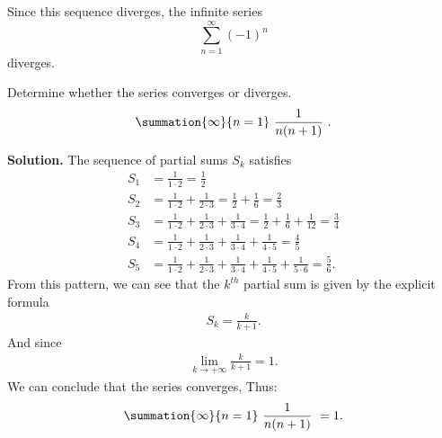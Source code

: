 \documentclass{report}
\begin{document}
    Since this sequence diverges, the infinite series 
    \[ \sum_{n=1}^{\infty} (-1)^n \]
    diverges.

    \bigbreak \noindent 
    \begin{eg}
     Determine whether the series converges or diverges. 
     \begin{align*}
         \summation{\infty}{n=1}\ \frac{1}{n(n+1)}\ 
     .\end{align*}

    \end{eg}
    \bigbreak \noindent 
    \textbf{Solution.}
    The sequence of partial sums \( S_k \) satisfies
    \begin{align*}
        S_1 & = \frac{1}{1 \cdot 2} = \frac{1}{2} \\
        S_2 & = \frac{1}{1 \cdot 2} + \frac{1}{2 \cdot 3} = \frac{1}{2} + \frac{1}{6} = \frac{2}{3} \\
        S_3 & = \frac{1}{1 \cdot 2} + \frac{1}{2 \cdot 3} + \frac{1}{3 \cdot 4} = \frac{1}{2} + \frac{1}{6} + \frac{1}{12} = \frac{3}{4} \\
        S_4 & = \frac{1}{1 \cdot 2} + \frac{1}{2 \cdot 3} + \frac{1}{3 \cdot 4} + \frac{1}{4 \cdot 5} = \frac{4}{5} \\
        S_5 & = \frac{1}{1 \cdot 2} + \frac{1}{2 \cdot 3} + \frac{1}{3 \cdot 4} + \frac{1}{4 \cdot 5} + \frac{1}{5 \cdot 6} = \frac{5}{6}.
    \end{align*}
    \bigbreak \noindent 
    From this pattern, we can see that the  $k^{th}$ partial sum is given by the explicit formula
    \begin{align*}
        S_{k} = \frac{k}{k+1}
    .\end{align*}
    \bigbreak \noindent 
    And since
    \begin{align*}
        \lim\limits_{k \to +\infty}{\frac{k}{k+1}} = 1
    .\end{align*}
    \bigbreak \noindent 
    We can conclude that the series converges, Thus:
    \begin{align*}
        \summation{\infty}{n=1}\ \frac{1}{n(n+1)}\  = 1
    .\end{align*}

    \pagebreak 
\end{document}

